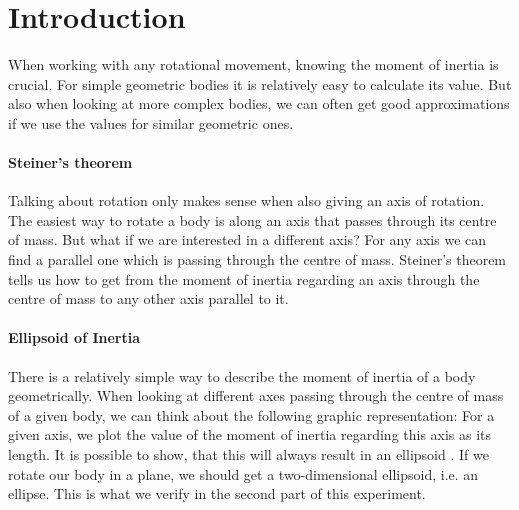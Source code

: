 \section{Introduction}

When working with any rotational movement, knowing the moment of inertia is crucial.
For simple geometric bodies it is relatively easy to calculate its value.
But also when looking at more complex bodies, we can often get good approximations if we use the values for similar geometric ones.

\paragraph{Steiner's theorem}
Talking about rotation only makes sense when also giving an axis of rotation.
The easiest way to rotate a body is along an axis that passes through its centre of mass. 
But what if we are interested in a different axis?
For any axis we can find a parallel one which is passing through the centre of mass.
Steiner's theorem tells us how to get from the moment of inertia regarding an axis through the centre of mass to any other axis parallel to it. 

\paragraph{Ellipsoid of Inertia}
There is a relatively simple way to describe the moment of inertia of a body geometrically.
When looking at different axes passing through the centre of mass of a given body, we can think about the following graphic representation:
For a given axis, we plot the value of the moment of inertia regarding this axis as its length.
It is possible to show, that this will always result in an ellipsoid \cite{manual}.
If we rotate our body in a plane, we should get a two-dimensional ellipsoid, i.e. an ellipse. 
This is what we verify in the second part of this experiment.
